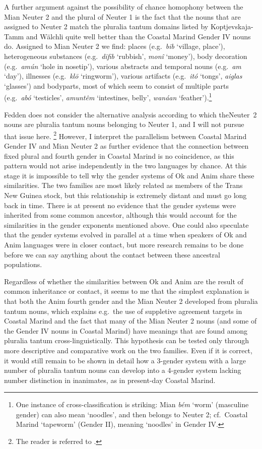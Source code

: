 \documentclass[output=collectionpaper]{langsci/langscibook}
\begin{document}
A further argument against the possibility of chance homophony between the Mian Neuter 2 and the plural of Neuter 1 is the fact that the nouns that are assigned to Neuter 2 match the pluralia tantum domains listed by Koptjevskaja-Tamm and W\"alchli quite well \textendash{} better than the Coastal Marind Gender IV nouns do. Assigned to Mian Neuter 2 we find: places (e.g.\ \emph{bib} `village, place'), heterogeneous substances (e.g.\ \emph{difib} `rubbish', \emph{mon\^i} `money'), body decoration (e.g.\ \emph{am\'un} `hole in nosetip'), various abstracts and temporal nouns (e.g.\ \emph{am} `day'), illnesses (e.g.\ \emph{kl\=o} `ringworm'), various artifacts (e.g.\ \emph{it\'o} `tongs', \emph{aiglas} `glasses') and bodyparts, most of which seem to consist of multiple parts (e.g.\ \emph{ab\'o} `testicles', \emph{amunt\^em} `intestines, belly', \emph{wan\'aan} `feather').\footnote{One instance of cross-classification is striking: Mian \emph{b\'em} `worm' (masculine gender) can also mean `noodles', and then belongs to Neuter 2; cf.\ Coastal Marind  `tapeworm' (Gender II), meaning `noodles' in Gender IV.}

Fedden does not consider the alternative analysis according to which the\linebreak Neuter~2 nouns are pluralia tantum nouns belonging to Neuter 1, and I will not pursue that issue here.%
\footnote{The reader is referred to \textcite{Corbett2017}.
} %
However, I interpret the parallelism between Coastal Marind Gender IV and Mian Neuter 2 as further evidence that the connection between fixed plural and fourth gender in Coastal Marind is no coincidence, as this pattern would not arise independently in the two languages by chance. At this stage it is impossible to tell why the gender systems of Ok and Anim share these similarities. The two families are most likely related as members of the Trans New Guinea stock, but this relationship is extremely distant and must go long back in time. There is at present no evidence that the gender systems were inherited from some common ancestor, although this would account for the similarities in the gender exponents mentioned above. One could also speculate that the gender systems evolved in parallel at a time when speakers of Ok and Anim languages were in closer contact, but more research remains to be done before we can say anything about the contact between these ancestral populations.


Regardless of whether the similarities between Ok and Anim are the result of common inheritance or contact, it seems to me that the simplest explanation is that both the Anim fourth gender and the Mian Neuter 2 developed from pluralia tantum nouns, which explains e.g.\ the use of suppletive agreement targets in Coastal Marind and the fact that many of the Mian Neuter 2 nouns (and some of the Gender IV nouns in Coastal Marind) have meanings that are found among pluralia tantum cross-linguistically. This hypothesis can be tested only through more descriptive and comparative work on the two families.
Even if it is correct, it would still remain to be shown in detail how a 3-gender system with a large number of pluralia tantum nouns can develop into a 4-gender system lacking number distinction in inanimates, as in present-day Coastal Marind.
\end{document}
